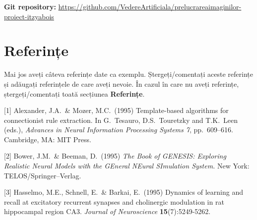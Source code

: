 \documentclass{article}
\begin{document}
\textbf{Git repository:} \url{https://github.com/VedereArtificiala/prelucrareaimaginilor-proiect-itzyabois}

\section*{Referințe}

\medskip

\small
\color{red}
Mai jos aveți câteva referințe date ca exemplu. Ștergeți/comentați aceste referințe și adăugați referințele de care aveți nevoie. În cazul în care nu aveți referințe, ștergeți/comentați toată secțiunea \textbf{Referințe}.

\color{black}
[1] Alexander, J.A.\ \& Mozer, M.C.\ (1995) Template-based algorithms for
connectionist rule extraction. In G.\ Tesauro, D.S.\ Touretzky and T.K.\ Leen
(eds.), {\it Advances in Neural Information Processing Systems 7},
pp.\ 609--616. Cambridge, MA: MIT Press.

[2] Bower, J.M.\ \& Beeman, D.\ (1995) {\it The Book of GENESIS: Exploring
  Realistic Neural Models with the GEneral NEural SImulation System.}  New York:
TELOS/Springer--Verlag.

[3] Hasselmo, M.E., Schnell, E.\ \& Barkai, E.\ (1995) Dynamics of learning and
recall at excitatory recurrent synapses and cholinergic modulation in rat
hippocampal region CA3. {\it Journal of Neuroscience} {\bf 15}(7):5249-5262.
\end{document}
